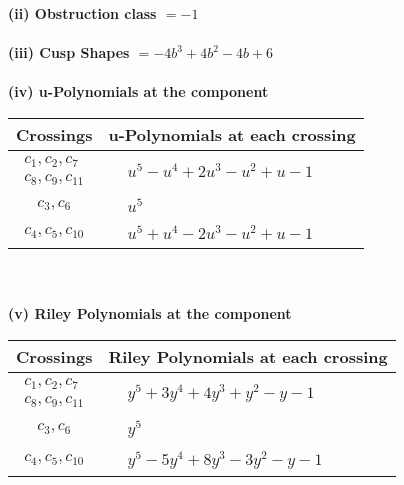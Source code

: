 \documentclass[1p]{elsarticle_modified}
\theoremstyle{definition}
\begin{document}
\flushleft \textbf{(ii) Obstruction class $= -1$}\\~\\
\flushleft \textbf{(iii) Cusp Shapes $= -4 b^3+4 b^2-4 b+6$}\\~\\
\newpage\renewcommand{\arraystretch}{1}
\flushleft \textbf{(iv) u-Polynomials at the component}\newline \\
\begin{tabular}{m{50pt}|m{274pt}}
Crossings & \hspace{64pt}u-Polynomials at each crossing \\
\hline $$\begin{aligned}c_{1},c_{2},c_{7}\\c_{8},c_{9},c_{11}\end{aligned}$$&$\begin{aligned}
&u^5- u^4+2 u^3- u^2+u-1
\end{aligned}$\\
\hline $$\begin{aligned}c_{3},c_{6}\end{aligned}$$&$\begin{aligned}
&u^5
\end{aligned}$\\
\hline $$\begin{aligned}c_{4},c_{5},c_{10}\end{aligned}$$&$\begin{aligned}
&u^5+u^4-2 u^3- u^2+u-1
\end{aligned}$\\
\hline
\end{tabular}\\~\\
\newpage\renewcommand{\arraystretch}{1}
\flushleft \textbf{(v) Riley Polynomials at the component}\newline \\
\begin{tabular}{m{50pt}|m{274pt}}
Crossings & \hspace{64pt}Riley Polynomials at each crossing \\
\hline $$\begin{aligned}c_{1},c_{2},c_{7}\\c_{8},c_{9},c_{11}\end{aligned}$$&$\begin{aligned}
&y^5+3 y^4+4 y^3+y^2- y-1
\end{aligned}$\\
\hline $$\begin{aligned}c_{3},c_{6}\end{aligned}$$&$\begin{aligned}
&y^5
\end{aligned}$\\
\hline $$\begin{aligned}c_{4},c_{5},c_{10}\end{aligned}$$&$\begin{aligned}
&y^5-5 y^4+8 y^3-3 y^2- y-1
\end{aligned}$\\
\hline
\end{tabular}\\~\\
\end{document}
